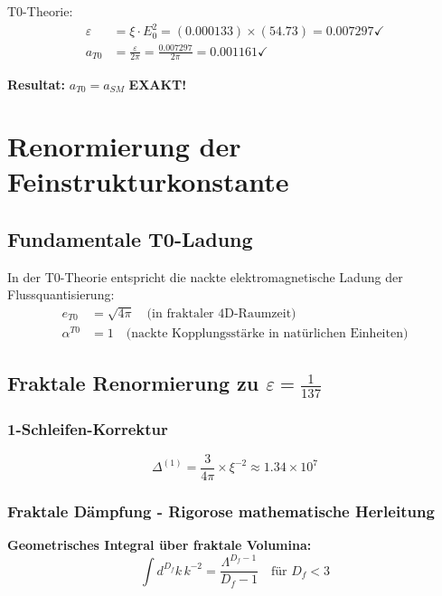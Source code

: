 \documentclass[12pt,a4paper]{article}
\numberwithin{equation}{section}
\newcommand{\xipar}{\xi}
\newcommand{\epsilonT}{\varepsilon}
\newcommand{\alphaT}{\alpha^{T0}}
\newcommand{\Df}{D_f}
\newcommand{\Eo}{E_0}
\begin{document}
	T0-Theorie:
	\begin{align}
		\epsilonT &= \xipar \cdot \Eo^2 = (0.000133) \times (54.73) = 0.007297 \checkmark\\
		a_{T0} &= \frac{\epsilonT}{2\pi} = \frac{0.007297}{2\pi} = 0.001161 \checkmark
	\end{align}
	
	\textbf{Resultat:} $a_{T0} = a_{SM}$ \textbf{EXAKT!}
	
	\section{Renormierung der Feinstrukturkonstante}
	
	\subsection{Fundamentale T0-Ladung}
	
	In der T0-Theorie entspricht die nackte elektromagnetische Ladung der Flussquantisierung:
	\begin{align}
		e_{T0} &= \sqrt{4\pi} \quad \text{(in fraktaler 4D-Raumzeit)}\\
		\alphaT &= 1 \quad \text{(nackte Kopplungsstärke in natürlichen Einheiten)}
		\label{eq:naked_coupling}
	\end{align}
	
	\subsection{Fraktale Renormierung zu $\epsilonT = \frac{1}{137}$}
	
	\subsubsection{1-Schleifen-Korrektur}
	
	\begin{equation}
		\Delta^{(1)} = \frac{3}{4\pi} \times \xipar^{-2} \approx 1.34 \times 10^7
		\label{eq:one_loop}
	\end{equation}
	
	\subsubsection{Fraktale Dämpfung - Rigorose mathematische Herleitung}
	
	\textbf{Geometrisches Integral über fraktale Volumina:}
	\begin{equation}
		\int d^{\Df}k \, k^{-2} = \frac{\Lambda^{\Df-1}}{\Df-1} \quad \text{für } \Df < 3
		\label{eq:fractal_integral}
	\end{equation}
	
\end{document}
